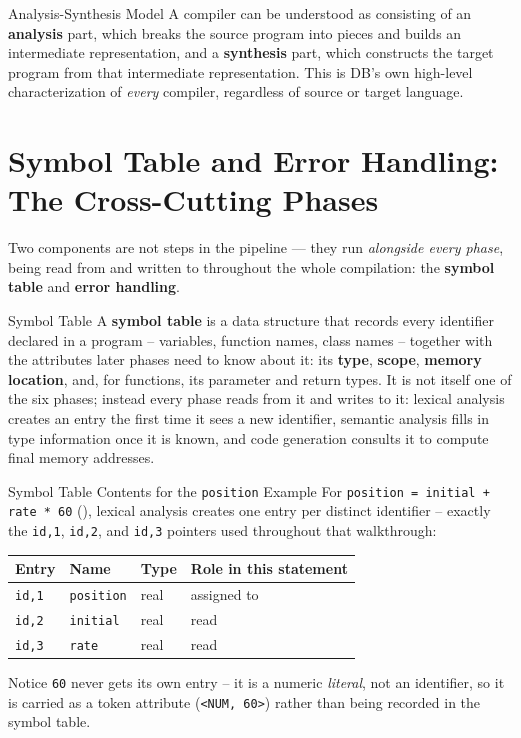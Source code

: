 \documentclass[full-course-notes.tex]{subfiles}
\begin{document}
\begin{defbox}{Analysis-Synthesis Model}
A compiler can be understood as consisting of an \textbf{analysis} part, which breaks the
source program into pieces and builds an intermediate representation, and a \textbf{synthesis}
part, which constructs the target program from that intermediate representation. This is DB's
own high-level characterization of \emph{every} compiler, regardless of source or target
language.
\end{defbox}

\section{Symbol Table and Error Handling: The Cross-Cutting Phases}
\label{sec:l2-symtab-error}

\dbtag Two components are not steps in the pipeline --- they run \emph{alongside every phase},
being read from and written to throughout the whole compilation: the \textbf{symbol table} and
\textbf{error handling}.

\begin{defbox}{Symbol Table}
A \textbf{symbol table} is a data structure that records every identifier declared in a program
-- variables, function names, class names -- together with the attributes later phases need to
know about it: its \textbf{type}, \textbf{scope}, \textbf{memory location}, and, for functions,
its parameter and return types. It is not itself one of the six phases; instead every phase
reads from it and writes to it: lexical analysis creates an entry the first time it sees a new
identifier, semantic analysis fills in type information once it is known, and code generation
consults it to compute final memory addresses.
\end{defbox}

\begin{examplebox}{Symbol Table Contents for the \texttt{position} Example}
For \texttt{position = initial + rate * 60} (), lexical analysis
creates one entry per distinct identifier -- exactly the \texttt{id,1}, \texttt{id,2}, and
\texttt{id,3} pointers used throughout that walkthrough:
\begin{center}
\renewcommand{\arraystretch}{1.3}
\begin{tabularx}{\textwidth}{@{}l l l X@{}}
\toprule
\textbf{Entry} & \textbf{Name} & \textbf{Type} & \textbf{Role in this statement} \\
\midrule
\texttt{id,1} & \texttt{position} & real & assigned to \\
\texttt{id,2} & \texttt{initial} & real & read \\
\texttt{id,3} & \texttt{rate} & real & read \\
\bottomrule
\end{tabularx}
\end{center}
Notice \texttt{60} never gets its own entry -- it is a numeric \emph{literal}, not an
identifier, so it is carried as a token attribute (\texttt{<NUM, 60>}) rather than being
recorded in the symbol table.
\end{examplebox}
\end{document}
